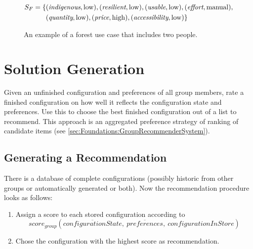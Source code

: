 \begin{figure}
\begin{mdframed}[frametitle={Example for Forest Use Case}, linecolor=black, frametitlerulecolor=black, frametitlebackgroundcolor=gray!5]
\begin{align}
            \begin{split}
            S_F  =  \{ & (\textit{indigenous}, \text{low}), (\textit{resilient}, \text{low}), (\textit{usable},\text{low}), (\textit{effort}, \text{manual}), \\
            & (\textit{quantity}, \text{low}), (\textit{price},\text{high}),(\textit{accessibility}, \text{low}) \} 
            \end{split} \notag
        \end{align}
    \end{mdframed}
    \caption{An example of a forest use case that includes two people.}
    \label{fig:Concept:ForestExample}
\end{figure}


\section{Solution Generation}
\label{sec:Concept:SolutionGeneration}


Given an unfinished configuration and preferences of all group members, rate a finished configuration on how well it reflects the configuration state and preferences. Use this to choose the best finished configuration out of a list to recommend. This approach is an aggregated preference strategy of ranking of candidate items (see \autoref{sec:Foundations:GroupRecommenderSystem}).

\subsection{Generating a Recommendation}


There is a database of complete configurations (possibly historic from other groups or automatically generated or both).
Now the recommendation procedure looks as follows:

\begin{enumerate}
    \item Assign a score to each stored configuration according to $$score_{group}(\overline{configurationState},\ \overline{preferences}, \ configurationInStore)$$
    \item Chose the configuration with the highest score as recommendation.
\end{enumerate}

